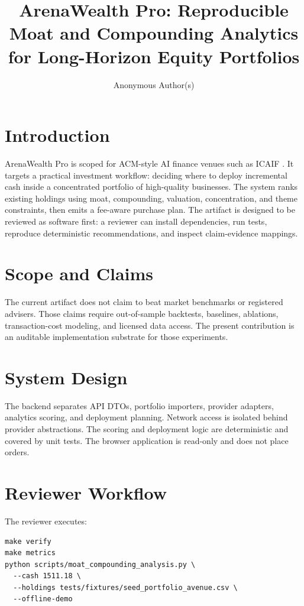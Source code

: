 \documentclass[sigconf,review,anonymous]{acmart}
\title{ArenaWealth Pro: Reproducible Moat and Compounding Analytics for Long-Horizon Equity Portfolios}
\author{Anonymous Author(s)}
\affiliation{%
  \institution{Anonymous Institution}
  \city{Anonymous}
  \country{Anonymous}
}
\begin{document}
\maketitle

\section{Introduction}

ArenaWealth Pro is scoped for ACM-style AI finance venues such as ICAIF
\cite{acmIcaif}. It targets a practical investment workflow: deciding where to
deploy incremental cash inside a concentrated portfolio of high-quality
businesses. The system ranks existing holdings using moat, compounding,
valuation, concentration, and theme constraints, then emits a fee-aware purchase
plan. The artifact is designed to be reviewed as software first: a reviewer can
install dependencies, run tests, reproduce deterministic recommendations, and
inspect claim-evidence mappings.

\section{Scope and Claims}

The current artifact does not claim to beat market benchmarks or registered
advisers. Those claims require out-of-sample backtests, baselines, ablations,
transaction-cost modeling, and licensed data access. The present contribution is
an auditable implementation substrate for those experiments.

\section{System Design}

The backend separates API DTOs, portfolio importers, provider adapters,
analytics scoring, and deployment planning. Network access is isolated behind
provider abstractions. The scoring and deployment logic are deterministic and
covered by unit tests. The browser application is read-only and does not place
orders.

\section{Reviewer Workflow}

The reviewer executes:

\begin{verbatim}
make verify
make metrics
python scripts/moat_compounding_analysis.py \
  --cash 1511.18 \
  --holdings tests/fixtures/seed_portfolio_avenue.csv \
  --offline-demo
\end{verbatim}
\end{document}
